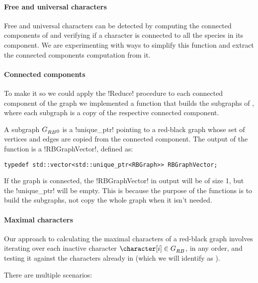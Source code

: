 \paragraph{Free and universal characters}

Free and universal characters can be detected by computing the connected components of \grb{} and verifying if a character is connected to all the species in its component.
We are experimenting with ways to simplify this function and extract the connected components computation from it.

\paragraph{Connected components}

To make it so we could apply the !Reduce! procedure to each connected component of the graph we implemented a function that builds the subgraphs of \grb{}, where each subgraph is a copy of the respective connected component.

A subgraph $G_{RB}^{}{}_{0}$ is a !unique_ptr! pointing to a red-black graph whose set of vertices and edges are copied from the  connected component.
The output of the function is a !RBGraphVector!, defined as:

\begin{lstlisting}[moreemph={RBGraph}]
  typedef std::vector<std::unique_ptr<RBGraph>> RBGraphVector;
\end{lstlisting}

If the graph \grb{} is connected, the !RBGraphVector! in output will be of size 1, but the !unique_ptr! will be empty.
This is because the purpose of the functions is to build the subgraphs, not copy the whole graph when it isn't needed.

\paragraph{Maximal characters}

Our approach to calculating the maximal characters of a red-black graph involves iterating over each inactive character $\character[i] \in \grb{}$, in any order, and testing it against the characters already in \cm{} (which we will identify as \character[j]).

There are multiple scenarios:

